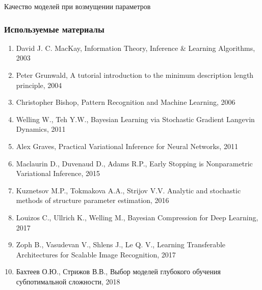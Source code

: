 \documentclass[10pt,pdf,utf8,russian,aspectratio=169]{beamer}
\begin{document}
\begin{frame}{Качество моделей при возмущении параметров}

\begin{figure}
  \centering
\label{fig:1}\qquad

\end{figure}

\end{frame}

\begin{frame}
\frametitle{Используемые материалы}
\begin{enumerate}
\item David J. C. MacKay, Information Theory, Inference \& Learning Algorithms, 2003
\item Peter Grunwald, A tutorial introduction to the minimum description length principle, 2004 
\item Christopher Bishop, Pattern Recognition and Machine Learning, 2006
\item Welling W., Teh Y.W., Bayesian Learning via Stochastic Gradient Langevin Dynamics, 2011
\item Alex Graves, Practical Variational Inference for Neural Networks, 2011
\item Maclaurin D., Duvenaud D., Adams R.P., Early Stopping is Nonparametric Variational Inference, 2015
\item Kuznetsov M.P., Tokmakova A.A., Strijov V.V. Analytic and stochastic methods of structure parameter estimation, 2016
\item Louizos C., Ullrich K., Welling M., Bayesian Compression for Deep Learning, 2017
\item Zoph B., Vasudevan V., Shlens J., Le Q. V., Learning Transferable Architectures for Scalable Image Recognition, 2017
\item Бахтеев О.Ю., Стрижов В.В., Выбор моделей глубокого обучения субпотимальной сложности, 2018
\end{enumerate}
\end{frame}
\end{document}
